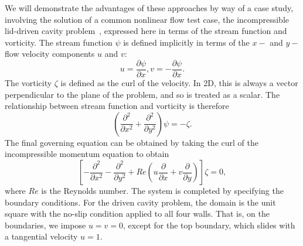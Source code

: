 \documentclass[acmtocl]{acmtrans2m}
\begin{document}
We will demonstrate the advantages of these approaches by way of a
case study, involving the solution of a common nonlinear flow test
case, the incompressible lid-driven cavity problem~\cite{Ghia},
expressed here in terms of the stream function and vorticity.  The
stream function $\psi$ is defined implicitly in terms of the $x-$ and
$y-$ flow velocity components $u$ and $v$:
\begin{equation}
  \label{eq:velocities}
  u = \frac{\partial \psi}{\partial x}, v = -\frac{\partial
    \psi}{\partial x}.
\end{equation}
The vorticity $\zeta$ is defined as the curl of the velocity.  In 2D,
this is always a vector perpendicular to the plane of the problem, and
so is treated as a scalar.  The relationship between stream function
and vorticity is therefore
\begin{equation}
  \label{eq:streamfunction}
  \left(\frac{\partial^2}{\partial x^2} + \frac{\partial^2}{\partial
    y^2}\right) \psi = -\zeta.
\end{equation}
The final governing equation can be obtained by taking the curl of the
incompressible momentum equation to obtain
\begin{equation}
  \label{eq:vorticity}
  \left[-\frac{\partial^2}{\partial x^2} - \frac{\partial^2}{\partial
    y^2} + Re \left(u \frac{\partial}{\partial x} + v
  \frac{\partial}{\partial y} \right)\right] \zeta = 0,
\end{equation}
where $Re$ is the Reynolds number.  The system is completed by
specifying the boundary conditions.  For the driven cavity problem,
the domain is the unit square with the no-slip condition applied to
all four walls.  That is, on the boundaries, we impose $u=v=0$, except
for the top boundary, which slides with a tangential velocity $u=1$.
\end{document}
